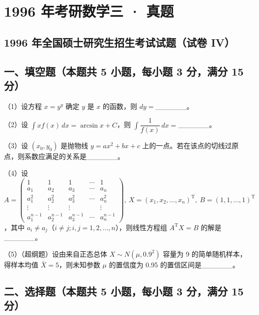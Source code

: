 \documentclass[UTF8,12pt]{ctexart}
\begin{document}
\section*{1996 年考研数学三 · 真题}
\subsection*{1996 年全国硕士研究生招生考试试题（试卷 IV）}

\subsection*{一、填空题（本题共 5 小题，每小题 3 分，满分 15 分）}

（1）设方程 \(\displaystyle x=y^y\) 确定 \(\displaystyle y\) 是 \(\displaystyle x\) 的函数，则 \(\displaystyle dy=\)\_\_\_\_\_\_。


（2）设 \(\displaystyle \int xf(x)\,dx=\arcsin x+C\)，则 \(\displaystyle \int\dfrac{\displaystyle 1}{\displaystyle f(x)}\,dx=\)\_\_\_\_\_\_。


（3）设 \(\displaystyle (x_0,\allowbreak y_0)\) 是抛物线 \(\displaystyle y=ax^2+bx+c\) 上的一点。若在该点的切线过原点，则系数应满足的关系是\_\_\_\_\_\_。


（4）设 \(\displaystyle A=\begin{pmatrix}1&1&1&\cdots&1\\a_1&a_2&a_3&\cdots&a_n\\a_1^2&a_2^2&a_3^2&\cdots&a_n^2\\\vdots&\vdots&\vdots&&\vdots\\a_1^{n-1}&a_2^{n-1}&a_3^{n-1}&\cdots&a_n^{n-1}\end{pmatrix},\allowbreak \ X=(x_1,\allowbreak x_2,\allowbreak \ldots,\allowbreak x_n)^{\mathrm T},\allowbreak \ B=(1,\allowbreak 1,\allowbreak \ldots,\allowbreak 1)^{\mathrm T}\)，其中 \(\displaystyle a_i\ne a_j\)（\(\displaystyle i\ne j;i,\allowbreak j=1,\allowbreak 2,\allowbreak \ldots,\allowbreak n\)），则线性方程组 \(\displaystyle A^{\mathrm T}X=B\) 的解是\_\_\_\_\_\_。


（5）（超纲题）设由来自正态总体 \(\displaystyle X\sim N(\mu,\allowbreak 0.9^2)\) 容量为 9 的简单随机样本，得样本均值 \(\displaystyle \bar X=5\)，则未知参数 \(\displaystyle \mu\) 的置信度为 0.95 的置信区间是\_\_\_\_\_\_。


\subsection*{二、选择题（本题共 5 小题，每小题 3 分，满分 15 分）}
\end{document}
